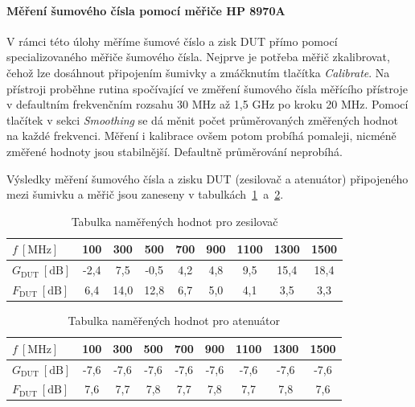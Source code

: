 \documentclass[11pt,a4paper]{article}
\begin{document}
\paragraph*{Měření šumového čísla pomocí měřiče HP 8970A} V rámci této úlohy měříme šumové číslo a zisk DUT přímo pomocí specializovaného měřiče šumového čísla. Nejprve je potřeba měřič zkalibrovat, čehož lze dosáhnout připojením šumivky a zmáčknutím tlačítka \emph{Calibrate}. Na přístroji proběhne rutina spočívající ve změření šumového čísla měřícího přístroje v defaultním frekvenčním rozsahu 30 MHz až 1,5 GHz po kroku 20 MHz. Pomocí tlačítek v sekci
\emph{Smoothing} se dá měnit počet průměrovaných změřených hodnot na každé frekvenci. Měření i kalibrace ovšem potom probíhá pomaleji, nicméně změřené hodnoty jsou stabilnější. Defaultně průměrování neprobíhá.

Výsledky měření šumového čísla a zisku DUT (zesilovač a atenuátor) připojeného mezi šumivku a měřič jsou zaneseny v tabulkách~\ref{table:task3-amp}~a~\ref{table:task3-att}.
\begin{table}[!ht]
\begin{center}
\begin{tabular}{| l || c | c | c | c | c | c | c | c |}
    \hline
    $f \ [\mathrm{MHz}]$ & 100 & 300 & 500 & 700 & 900 & 1100 & 1300 & 1500 \\
    \hline\hline
    $G_{\mathrm{DUT}} \ [\mathrm{dB}]$ & -2,4 & 7,5 & -0,5 & 4,2 & 4,8 & 9,5 & 15,4 & 18,4 \\
    \hline
    $F_{\mathrm{DUT}} \ [\mathrm{dB}]$ & 6,4 & 14,0 & 12,8 & 6,7 & 5,0 & 4,1 & 3,5 & 3,3 \\
    \hline
\end{tabular}
\caption{Tabulka naměřených hodnot pro zesilovač}
\label{table:task3-amp}
\end{center}
\end{table}

\begin{table}[!ht]
\begin{center}
\begin{tabular}{| l || c | c | c | c | c | c | c | c |}
    \hline
    $f \ [\mathrm{MHz}]$ & 100 & 300 & 500 & 700 & 900 & 1100 & 1300 & 1500 \\
    \hline\hline
    $G_{\mathrm{DUT}} \ [\mathrm{dB}]$ & -7,6 & -7,6 & -7,6 & -7,6 & -7,6 & -7,6 & -7,6 & -7,6 \\
    \hline
    $F_{\mathrm{DUT}} \ [\mathrm{dB}]$ & 7,6 & 7,7 & 7,8 & 7,7 & 7,8 & 7,7 & 7,8 & 7,6 \\
    \hline
\end{tabular}
\caption{Tabulka naměřených hodnot pro atenuátor}
\label{table:task3-att}
\end{center}
\end{table}
\end{document}

